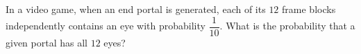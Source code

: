 In a video game, when an end portal is generated, each of its $12$ frame blocks independently contains an eye with probability $\dfrac{1}{10}$. What is the probability that a given portal has all $12$ eyes?
